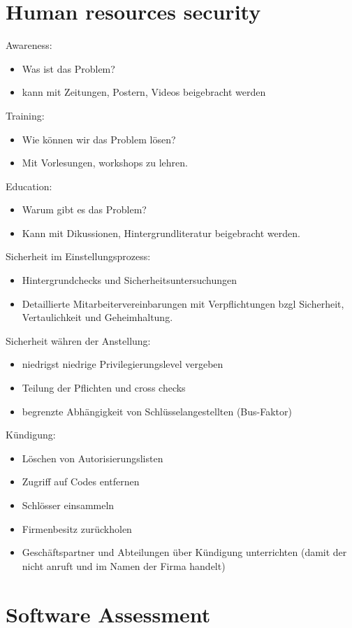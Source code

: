 \documentclass{article} %
\begin{document}
\section{Human resources security}
Awareness:
\begin{itemize}
	\item Was ist das Problem? 
    \item kann mit Zeitungen, Postern, Videos beigebracht werden
\end{itemize}
Training:
\begin{itemize}
	\item Wie können wir das Problem lösen?
    \item Mit Vorlesungen, workshops zu lehren.
\end{itemize}
Education:
\begin{itemize}
	\item Warum gibt es das Problem?
    \item Kann mit Dikussionen, Hintergrundliteratur beigebracht werden.
\end{itemize}
Sicherheit im Einstellungsprozess:
\begin{itemize}
	\item Hintergrundchecks und Sicherheitsuntersuchungen
    \item Detaillierte Mitarbeitervereinbarungen mit Verpflichtungen bzgl Sicherheit, Vertaulichkeit und Geheimhaltung.
\end{itemize}
Sicherheit währen der Anstellung:
\begin{itemize}
	\item niedrigst niedrige Privilegierungslevel vergeben
    \item Teilung der Pflichten und cross checks
    \item begrenzte Abhängigkeit von Schlüsselangestellten (Bus-Faktor)
\end{itemize}
Kündigung:
\begin{itemize}
	\item Löschen von Autorisierungslisten
    \item Zugriff auf Codes entfernen
    \item Schlösser einsammeln
    \item Firmenbesitz zurückholen
    \item Geschäftspartner und Abteilungen über Kündigung unterrichten (damit der nicht anruft und im Namen der Firma handelt)
\end{itemize}
\section{Software Assessment}
\end{document}
